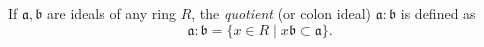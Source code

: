 If $\mathfrak{a}, \mathfrak{b}$ are ideals of any ring $R$, the \textit{quotient} (or colon ideal) $\mathfrak{a} : \mathfrak{b}$ is defined as
$$\mathfrak{a} : \mathfrak{b} = \{ x \in R \mid x\mathfrak{b} \subset \mathfrak{a} \}.$$
